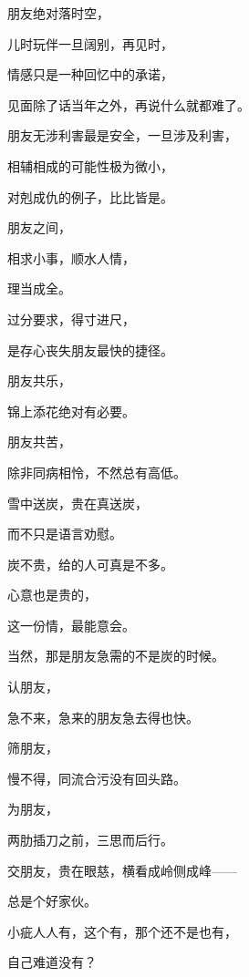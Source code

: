 \par 
\par 朋友绝对落时空，
\par 儿时玩伴一旦阔别，再见时，
\par 情感只是一种回忆中的承诺，
\par 见面除了话当年之外，再说什么就都难了。
\par 
\par 朋友无涉利害最是安全，一旦涉及利害，
\par 相辅相成的可能性极为微小，
\par 对剋成仇的例子，比比皆是。
\par 
\par 朋友之间，
\par 相求小事，顺水人情，
\par 理当成全。
\par 
\par 过分要求，得寸进尺，
\par 是存心丧失朋友最快的捷径。
\par 
\par 朋友共乐，
\par 锦上添花绝对有必要。
\par 
\par 朋友共苦，
\par 除非同病相怜，不然总有高低。
\par 
\par 雪中送炭，贵在真送炭，
\par 而不只是语言劝慰。
\par 炭不贵，给的人可真是不多。
\par 心意也是贵的，
\par 这一份情，最能意会。
\par 当然，那是朋友急需的不是炭的时候。
\par 
\par 认朋友，
\par 急不来，急来的朋友急去得也快。
\par 
\par 筛朋友，
\par 慢不得，同流合污没有回头路。
\par 
\par 为朋友，
\par 两肋插刀之前，三思而后行。
\par 交朋友，贵在眼慈，横看成岭侧成峰——
\par 总是个好家伙。
\par 小疵人人有，这个有，那个还不是也有，
\par 自己难道没有？

